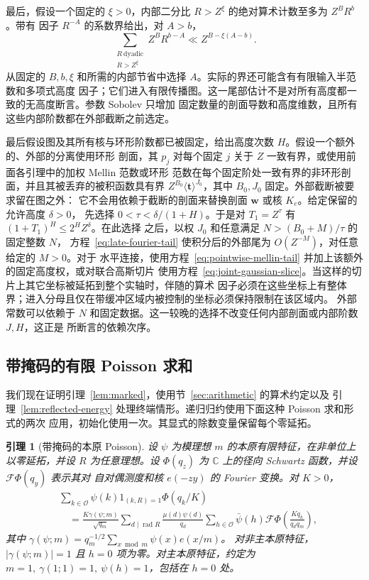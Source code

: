 \documentclass[11pt,a4paper]{article}
\numberwithin{equation}{section}
\numberwithin{figure}{section}
\newtheorem{lemma}[theorem]{引理}
\theoremstyle{definition}
\theoremstyle{remark}
\begin{document}
最后，假设一个固定的 $\xi>0$，内部二分比 $R>Z^\xi$ 的绝对算术计数至多为 $Z^B R^b$。带有
因子 $R^{-A}$ 的系数界给出，对 $A>b$，
\[
 \sum_{\substack{R\ \mathrm{dyadic}\\R>Z^\xi}}Z^B R^{b-A}
       \ll Z^{B-\xi(A-b)}.
\]
从固定的 $B,b,\xi$ 和所需的内部节省中选择 $A$。实际的界还可能含有有限输入半范数和多项式高度
因子；它们进入有限传播图。这一尾部估计不是对所有高度都一致的无高度断言。参数 Sobolev 只增加
固定数量的剖面导数和高度维数，且所有这些内部阶数都在外部截断之前选定。

最后假设图及其所有核与环形阶数都已被固定，给出高度次数 $H$。假设一个额外的、外部的分离使用环形
剖面，其 $p_j$ 对每个固定 $j$ 关于 $Z$ 一致有界，或使用前面各引理中的加权 Mellin 范数或环形
范数在每个固定阶处一致有界的非环形剖面，并且其被丢弃的被积函数具有界
$Z^{B_0}\langle\boldsymbol t\rangle^{J_0}$，其中 $B_0,J_0$ 固定。外部截断被要求留在图之外：
它不会用依赖于截断的剖面来替换剖面 $\boldsymbol w$ 或核 $K_e$。给定保留的允许高度 $\delta>0$，
先选择 $0<\tau<\delta/(1+H)$。于是对 $T_1=Z^\tau$ 有 $(1+T_1)^H\le2^H Z^\delta$。在此选择
之后，以权 $J_0$ 和任意满足 $N>(B_0+M)/\tau$ 的固定整数 $N$，
方程~\eqref{eq:late-fourier-tail} 使积分后的外部尾为 $O(Z^{-M})$，对任意给定的 $M>0$。对于
水平连接，使用方程~\eqref{eq:pointwise-mellin-tail} 并加上该额外的固定高度权，或对联合高斯切片
使用方程~\eqref{eq:joint-gaussian-slice}。当这样的切片上其它坐标被延拓到整个实轴时，伴随的算术
因子必须在这些坐标上有整体界；进入分母且仅在带缓冲区域内被控制的坐标必须保持限制在该区域内。
外部常数可以依赖于 $N$ 和固定数据。这一较晚的选择不改变任何内部剖面或内部阶数 $J,H$，这正是
所断言的依赖次序。

\subsection{带掩码的有限 Poisson 求和}

我们现在证明引理~\ref{lem:marked}，使用节~\ref{sec:arithmetic} 的算术约定以及
引理~\ref{lem:reflected-energy} 处理终端情形。递归归约使用下面这种 Poisson 求和形式的两次
应用，初始化使用一次。其显式的除数变量保留每个零延拓。

\begin{lemma}[带掩码的本原 Poisson]\label{lem:masked-poisson}
设 \(\psi\) 为模理想 \(m\) 的本原有限特征，在非单位上以零延拓，并设 \(R\) 为任意理想。设
\(\Phi(q_z)\) 为 \(\mathbb C\) 上的径向 Schwartz 函数，并设 \(\mathcal F\Phi(q_y)\) 表示其对
自对偶测度和核 \(e(-zy)\) 的 Fourier 变换。对 \(K>0\)，
\begin{equation}\label{eq:masked-poisson}
 \begin{split}
 &\sum_{k\in\mathcal O}\psi(k)1_{(k,R)=1}\Phi(q_k/K)\\
 &\quad=\frac{K\gamma(\psi;m)}{\sqrt{q_m}}
 \sum_{d\mid\operatorname{rad}R}\frac{\mu(d)\psi(d)}{q_d}
 \sum_{h\in\mathcal O}\bar\psi(h)
       \mathcal F\Phi\!\left(\frac{Kq_h}{q_dq_m}\right),
 \end{split}
\end{equation}
其中
\(\gamma(\psi;m)=q_m^{-1/2}\sum_{x\bmod m}\psi(x)e(x/m)\)。
对非主本原特征，\(|\gamma(\psi;m)|=1\) 且 \(h=0\) 项为零。对主本原特征，约定为
\(m=1,\ \gamma(1;1)=1,\ \psi(h)=1\)，包括在 \(h=0\) 处。
\end{lemma}
\end{document}
